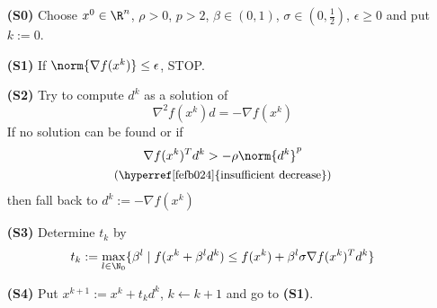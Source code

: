 \begin{enumerate}
	\item [\textbf{(S0)}] Choose $x^0\in\R^n$, $\rho>0$, $p>2$, $\beta\in(0,1)$, $\sigma\in(0,\frac12)$, $\epsilon\geq0$ and put $k:=0$.
	\item [\textbf{(S1)}] If $\norm{\nabla f(x^k)}\leq\epsilon$, STOP.
	\item [\textbf{(S2)}] Try to compute $d^k$ as a solution of
	      $$\nabla^2f(x^k)d=-\nabla f(x^k)$$
	      If no solution can be found or if
	      \begin{gather*}
		      \nabla f(x^k)^Td^k>-\rho\norm{d^k}^p\\
		      \text{\small{(\hyperref[fefb024]{insufficient decrease})}}
	      \end{gather*}
	      then fall back to $d^k:=-\nabla f(x^k)$
	\item [\textbf{(S3)}] Determine $t_k$ by
	      $$t_k:=\max_{l\in\N_0}\{\beta^l\mid f(x^k+\beta^ld^k)\leq f(x^k)+\beta^l\sigma\nabla f(x^k)^Td^k\}$$
	\item [\textbf{(S4)}] Put $x^{k+1}:=x^k+t_kd^k$, $k\gets k+1$ and go to \textbf{(S1)}.
\end{enumerate}

